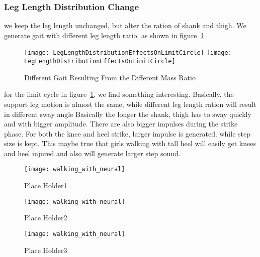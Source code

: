 


	


\subsubsection*{Leg Length Distribution Change}
we keep the leg length unchanged, but alter the ration of shank and thigh.
We generate gait with different leg length ratio.
as shown in figure~\ref{fig:differentlr}

\begin{figure}[!htbp]
  \begin{center}
    \leavevmode
    \ifpdf
      \texttt{[image: LegLengthDistributionEffectsOnLimitCircle]}
    \else
      \texttt{[image: LegLengthDistributionEffectsOnLimitCircle]}
    \fi
    \caption{Different Gait Resulting From the Different Mass Ratio}
    \label{fig:differentlr}
\end{center}
\end{figure}

for the limit cycle in figure~\ref{fig:differentlr}, we find something interesting.
Basically, the support leg motion is almost the same, while different leg length ration will result in different sway angle
Basically the longer the shank, thigh has to sway quickly and with bigger amplitude.
There are also bigger impulses during the strike phase. For both the knee and heel strike, larger impulse is generated.
while step size is kept.
This maybe true that girls walking with tall heel will easily get knees and heel injured and also will generate larger step sound.


\begin{figure}[!htbp]
  \begin{center}
      \texttt{[image: walking\_with\_neural]}
    \caption{Place Holder1}
    \label{fig:lr1}
\end{center}
\end{figure}

\begin{figure}[!htbp]
  \begin{center}
      \texttt{[image: walking\_with\_neural]}
    \caption{Place Holder2}
    \label{fig:lr2}
\end{center}
\end{figure}

\begin{figure}[!htbp]
  \begin{center}
      \texttt{[image: walking\_with\_neural]}
    \caption{Place Holder3}
    \label{fig:lr3}
\end{center}
\end{figure}




